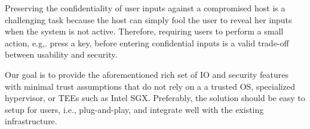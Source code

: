 Preserving the confidentiality of user inputs against a compromised host is a challenging task because the host can simply fool the user to reveal her inputs when the system is not active. Therefore, requiring users to perform a small action, e.g,. press a key, before entering confidential inputs is a valid trade-off between usability and security.


Our goal is to provide the aforementioned rich set of IO and security features with minimal trust assumptions that do not rely on a a trusted OS, specialized hypervisor, or TEEs such as Intel SGX. Preferably, the solution should be easy to setup for users, i.e., plug-and-play, and integrate well with the existing infrastructure.  
